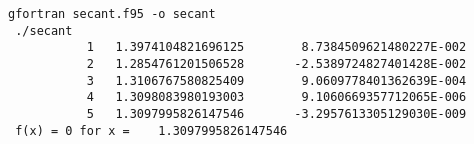 \begin{Verbatim}[frame=lines,label=secant - commands and output]
 gfortran secant.f95 -o secant
 ./secant
           1   1.3974104821696125        8.7384509621480227E-002
           2   1.2854761201506528       -2.5389724827401428E-002
           3   1.3106767580825409        9.0609778401362639E-004
           4   1.3098083980193003        9.1060669357712065E-006
           5   1.3097995826147546       -3.2957613305129030E-009
 f(x) = 0 for x =    1.3097995826147546     
\end{Verbatim}
